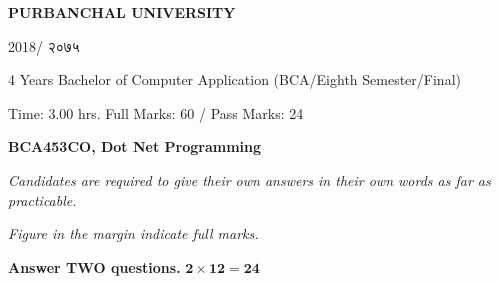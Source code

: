 \documentclass[a4paper, twoside, 12pt, noanswers]{exam}
\newcommand{\textnp}{\texthindi}
\begin{document}
\begin{framed}
	\raggedright{\bfseries\Large\centering PURBANCHAL UNIVERSITY \par {2018/ \textnp{२०७५}}\par}
	{ 4 Years Bachelor of Computer Application (BCA/Eighth Semester/Final)\par}
	{ Time: 3.00 hrs.  \hfill Full Marks: 60 / Pass Marks: 24\par}
	{\bfseries {BCA453CO, Dot Net Programming\hfill}\par}
\end{framed}

{\noindent \it{Candidates are required to give their own answers in their own words as far as practicable.  }\par}
{\noindent \it{Figure in the margin indicate full marks.}\par}

{}
{\hspace*{-0.5cm} \bfseries Answer TWO questions.} \hfill {\( \mathbf{2\times 12 =24}\)}
\end{document}

